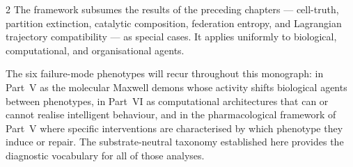 \begin{multicols}{2}
The framework subsumes the results of the preceding chapters --- cell-truth, partition
extinction, catalytic composition, federation entropy, and Lagrangian trajectory
compatibility --- as special cases. It applies uniformly to biological, computational,
and organisational agents.

The six failure-mode phenotypes will recur throughout this monograph: in Part~V as the
molecular Maxwell demons whose activity shifts biological agents between phenotypes, in
Part~VI as computational architectures that can or cannot realise intelligent behaviour,
and in the pharmacological framework of Part~V where specific interventions are
characterised by which phenotype they induce or repair. The substrate-neutral taxonomy
established here provides the diagnostic vocabulary for all of those analyses.

\end{multicols}
